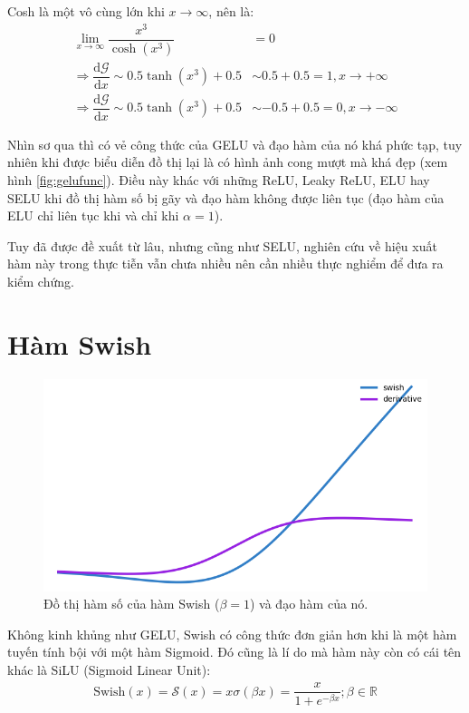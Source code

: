 Cosh là một vô cùng lớn khi $x \rightarrow \infty$, nên là:
\begin{align}
    \lim_{x \rightarrow \infty}\dfrac{x^3}{\cosh(x^3)} &= 0\\
    \Rightarrow \dfrac{\text{d}\mathcal{G}}{\text{d}x} \sim 0.5\tanh(x^3) + 0.5 &\sim 0.5 + 0.5 = 1, x \rightarrow +\infty\\
    \Rightarrow \dfrac{\text{d}\mathcal{G}}{\text{d}x} \sim 0.5\tanh(x^3) + 0.5 &\sim -0.5 + 0.5 = 0, x \rightarrow -\infty
\end{align}

Nhìn sơ qua thì có vẻ công thức của GELU và đạo hàm của nó khá phức tạp, tuy nhiên khi được biểu diễn đồ thị lại là có hình ảnh cong mượt mà khá đẹp (xem hình \ref{fig:gelufunc}).
Điều này khác với những ReLU, Leaky ReLU, ELU hay SELU khi đồ thị hàm số bị gãy và đạo hàm không được liên tục (đạo hàm của ELU chỉ liên tục khi và chỉ khi $\alpha = 1$).
\vspace{5pt}

Tuy đã được đề xuất từ lâu, nhưng cũng như SELU, nghiên cứu về hiệu xuất hàm này trong thực tiễn vẫn chưa nhiều nên cần nhiều thực nghiểm để đưa ra kiểm chứng.

\section{Hàm Swish}\label{sec:hamswish}

\begin{figure}[!h]
\captionsetup{width=0.8\textwidth}
\centering
\includegraphics[width=15cm]{images/swish.PNG}
\caption{Đồ thị hàm số của hàm Swish ($\beta = 1$) và đạo hàm của nó.}
\label{fig:swishfunc}
\end{figure}

Không kinh khủng như GELU, Swish \cite{ramachandran2017searching} có công thức đơn giản hơn khi là một hàm tuyến tính bội với một hàm Sigmoid.
Đó cũng là lí do mà hàm này còn có cái tên khác là SiLU (Sigmoid Linear Unit):
\begin{align}
    \text{Swish}(x) = \mathcal{S}(x) = x\sigma(\beta x) = \dfrac{x}{1 + e^{-\beta x}}; \beta \in \mathbb{R}
\end{align}

